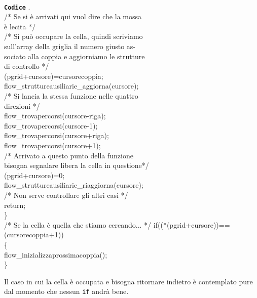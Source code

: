 \documentclass[11pt,a4paper,twocolumn]{IEEEtran}
\newcommand{\bsepline}{\noindent\makebox[\linewidth]{\rule{7.5cm}{1.2pt}}}
\newcommand{\esepline}{\noindent\makebox[\linewidth]{\rule{7.5cm}{0.5pt}}}
\newcommand{\code}[1]{\textbf{\texttt{#1}}}
\newcounter{algoritmo}
\newenvironment{algoritmo}{\bsepline\\{\large \code{Codice} \arabic{section}.\arabic{algoritmo}}\\ \bsepline}{\\\esepline\addtocounter{algoritmo}{1}}
\begin{document}
\begin{itemize}
\begin{algoritmo}
{		\text{ }\quad /* Se si è arrivati qui vuol dire che la mossa\\ \text{ }\quad è lecita */\\
		\text{ }\quad/* Si può occupare la cella, quindi scriviamo\\\text{ }\quad sull'array della griglia il numero giusto as-\\\text{ }\quad sociato alla coppia e aggiorniamo le strutture\\\text{ }\quad di controllo */\\
		\text{ }\quad *(pgrid+cursore)=cursorecoppia;\\
		\text{ }\quad flow\_struttureausiliarie\_aggiorna(cursore);\medskip\\
		\text{ }\quad /* Si lancia la stessa funzione nelle quattro\\ \text{ }\quad direzioni */\\
		\text{ }\quad flow\_trovapercorsi(cursore-riga);\\
		\text{ }\quad flow\_trovapercorsi(cursore-1);\\
		\text{ }\quad flow\_trovapercorsi(cursore+riga);\\
		\text{ }\quad flow\_trovapercorsi(cursore+1);\medskip\\
		\text{ }\quad /* Arrivato a questo punto della funzione\\\text{ }\quad bisogna segnalare libera la cella in questione*/\\
		\text{ }\quad *(pgrid+cursore)=0;\\
		\text{ }\quad flow\_struttureausiliarie\_riaggiorna(cursore);\medskip\\
		\text{ }\quad /* Non serve controllare gli altri casi */\\
		\text{ }\quad return;\\
		\text{ }\}\medskip\\
	/* Se la cella è quella che stiamo cercando... */
	if((*(pgrid+cursore))==(cursorecoppia+1))\\
	\text{ }\{\\
	\text{ }\quad flow\_inizializzaprossimacoppia();\\
	\text{ }\}
	}
	\end{algoritmo}
	Il caso in cui la cella è occupata e bisogna ritornare indietro è contemplato pure dal momento che nessun \texttt{if} andrà bene.
	\end{itemize}
\end{document}
